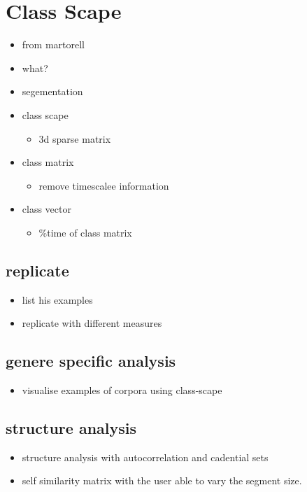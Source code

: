 \documentclass{article}
\begin{document}
\section{Class Scape}
\label{sec-8}

\begin{itemize}
\item from martorell
\item what?
\item segementation
\item class scape
\begin{itemize}
\item 3d sparse matrix
\end{itemize}
\item class matrix
\begin{itemize}
\item remove timescalee information
\end{itemize}
\item class vector
\begin{itemize}
\item \%time of class matrix
\end{itemize}
\end{itemize}
\subsection{replicate}
\label{sec-8-1}

\begin{itemize}
\item list his examples
\item replicate with different measures
\end{itemize}
\subsection{genere specific analysis}
\label{sec-8-2}

\begin{itemize}
\item visualise examples of corpora using class-scape
\end{itemize}
\subsection{structure analysis}
\label{sec-8-3}

\begin{itemize}
\item structure analysis with autocorrelation and cadential sets
\item self similarity matrix with the user able to vary the segment size.
\end{itemize}
\end{document}
